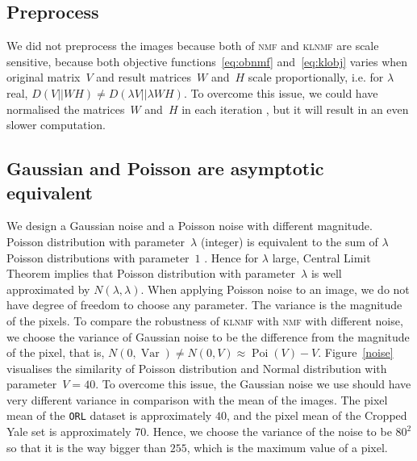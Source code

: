 \subsection{Preprocess}
We did not preprocess the images because both of \textsc{nmf} and \textsc{klnmf} are scale sensitive, because both objective functions~\eqref{eq:obnmf} and~\eqref{eq:klobj} varies when original matrix~$V$ and result matrices~$W$ and~$H$ scale proportionally, i.e. for $\lambda$ real, $D(V||WH)\neq D(\lambda V||\lambda WH)$. To overcome this issue, we could have normalised the matrices~$W$ and~$H$ in each iteration \citep{scaless}, but it will result in an even slower computation.

\subsection{Gaussian and Poisson are asymptotic equivalent}
 We design a Gaussian noise and a Poisson noise with different magnitude.
 Poisson distribution with parameter~$\lambda$ (integer) is equivalent to the sum of $\lambda$ Poisson distributions with parameter~$1$ \citep[][p. 45]{Walck:1996cca}.
 Hence for $\lambda$ large, Central Limit Theorem implies that Poisson distribution with parameter~$\lambda$ is well approximated by $N(\lambda,\lambda)$.
 When applying Poisson noise to an image, we do not have degree of freedom to choose any parameter.
 The variance is the magnitude of the pixels. To compare the robustness of \textsc{klnmf} with \textsc{nmf} with different noise, we choose the variance of Gaussian noise to be the difference from the magnitude of the pixel, that is, $N(0,\operatorname{Var})\neq N(0,V)\approx \operatorname{Poi}(V)-V$.
 Figure~\ref{noise} visualises the similarity of Poisson distribution and Normal distribution with parameter~$V=40$. To overcome this issue, the Gaussian noise we use should have very different variance in comparison with the mean of the images. The pixel mean of the \texttt{ORL} dataset is approximately $40$, and the pixel mean of the Cropped Yale set is approximately $70$. Hence, we choose the variance of the noise to be $80^2$ so that it is the way bigger than $255$, which is the maximum value of a pixel.
